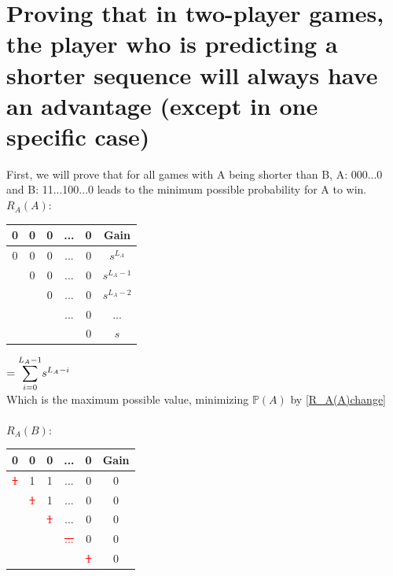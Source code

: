 \documentclass[english,12pt,a4paper,final]{article}
\begin{document}
\part{Proving that in two-player games, the player who is predicting a shorter sequence will always have an advantage (except in one specific case)}\label{shorterSequenceProof}

First, we will prove that for all games with A being shorter than B, A: 000...0 and B: 11...100...0 leads to the minimum possible probability for A to win.
\\
${R_A(A)}$:
\begin{tabular}{|ccccc|c|}
	\hline
	0 & 0 & 0 & ... & 0 & Gain \\
	\hline
	
	\textcolor{OliveGreen}{0} & \textcolor{OliveGreen}{0} & \textcolor{OliveGreen}{0} & \textcolor{OliveGreen}{...} & \textcolor{OliveGreen}{0} & $s^{L_A}$\\
	
	& \textcolor{OliveGreen}{0} & \textcolor{OliveGreen}{0} & \textcolor{OliveGreen}{...} & \textcolor{OliveGreen}{0} & $s^{L_A-1}$\\
	
	&  & \textcolor{OliveGreen}{0} & \textcolor{OliveGreen}{...} & \textcolor{OliveGreen}{0} & $s^{L_A-2}$ \\
	
	&  &  & \textcolor{OliveGreen}{...} & \textcolor{OliveGreen}{0} & ... \\
	
	&  &  &  & \textcolor{OliveGreen}{0} & $s$ \\
	\hline
\end{tabular}
$=\mathlarger\sum_{i=0}^{L_A-1}s^{L_A-i}$
\\
Which is the maximum possible value, minimizing $\mathbb{P}(A)$ by \eqref{R_A(A)change} 
\\\\
${R_A(B)}$:
\begin{tabular}{|ccccc|c|}
	\hline
	0 & 0 & 0 & ... & 0 & Gain \\
	\hline
	
	\textcolor{red}{\sout{1}} & 1 & 1 & ... & 0 & $0$\\
	
	& \textcolor{red}{\sout{1}} & 1 & ... & 0 & $0$\\
	
	&  & \textcolor{red}{\sout{1}} & ... & 0 & $0$\\
	
	&  &  & \textcolor{red}{\sout{...}} & 0 & $0$ \\
	
	&  &  &  & \textcolor{red}{\sout{1}} & $0$ \\
	\hline
\end{tabular}
\end{document}
